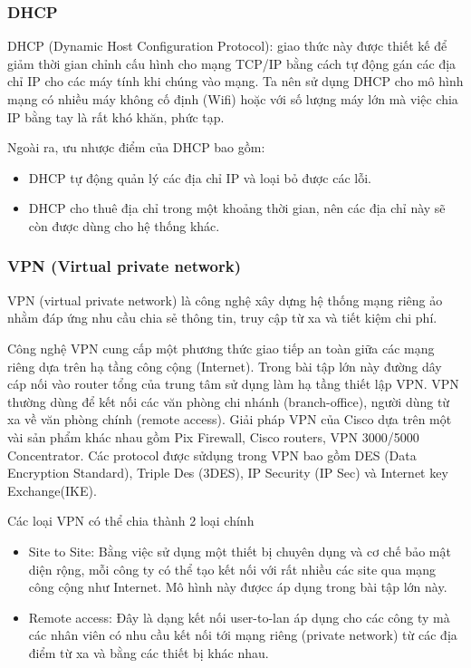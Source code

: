 \documentclass[a4paper]{article}
\begin{document}
\subsubsection{DHCP}
DHCP (Dynamic Host Configuration Protocol): giao thức này được thiết kế để giảm thời gian chỉnh cấu hình cho mạng TCP/IP bằng cách tự động gán các địa chỉ IP cho các máy tính khi chúng vào mạng. Ta nên sử dụng DHCP cho mô hình mạng có nhiều máy không cố định (Wifi) hoặc với số lượng máy lớn mà việc chia IP bằng tay là rất khó khăn, phức tạp.

Ngoài ra, ưu nhược điểm của DHCP bao gồm:
    \begin{itemize}
        \item DHCP tự động quản lý các địa chỉ IP và loại bỏ được các lỗi.
        \item DHCP cho thuê địa chỉ trong một khoảng thời gian, nên các địa chỉ này sẽ còn được dùng cho hệ thống khác.
    \end{itemize}

\subsubsection{VPN (Virtual private network)}
VPN (virtual private network) là công nghệ xây dựng hệ thống mạng riêng ảo nhằm đáp ứng nhu cầu chia sẻ thông tin, truy cập từ xa và tiết kiệm chi phí.

Công nghệ VPN cung cấp một phương thức giao tiếp an toàn giữa các mạng riêng dựa trên hạ tầng công cộng (Internet). Trong bài tập lớn này đường dây cáp nối vào router tổng của trung tâm sử dụng làm hạ tầng thiết lập VPN. VPN thường dùng để kết nối các văn phòng chi nhánh (branch-office), người dùng từ xa về văn phòng chính (remote access). Giải pháp VPN của Cisco dựa trên một vài sản phẩm khác nhau gồm Pix Firewall, Cisco routers, VPN 3000/5000 Concentrator. Các protocol được sửdụng trong VPN bao gồm DES (Data Encryption Standard), Triple Des (3DES), IP Security (IP Sec) và Internet key Exchange(IKE).

Các loại VPN có thể chia thành 2 loại chính
    \begin{itemize}
        \item Site to Site: Bằng việc sử dụng một thiết bị chuyên dụng và cơ chế bảo mật diện rộng, mỗi công ty có thể tạo kết nối với rất nhiều các site qua mạng công cộng như Internet. Mô hình này đượcc áp dụng trong bài tập lớn này.
        \item Remote access: Đây là dạng kết nối user-to-lan áp dụng cho các công ty mà các nhân viên có nhu cầu kết nối tới mạng riêng (private network) từ các địa điểm từ xa và bằng các thiết bị khác nhau.
    \end{itemize}
\end{document}
